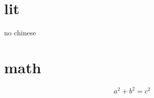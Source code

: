 \documentclass[UTF8]{ctexart}
\begin{document}
\section{lit}
no chinese
\section{math}
\[
	a^2 + b^2 = c^2
\] 
\end{document}
